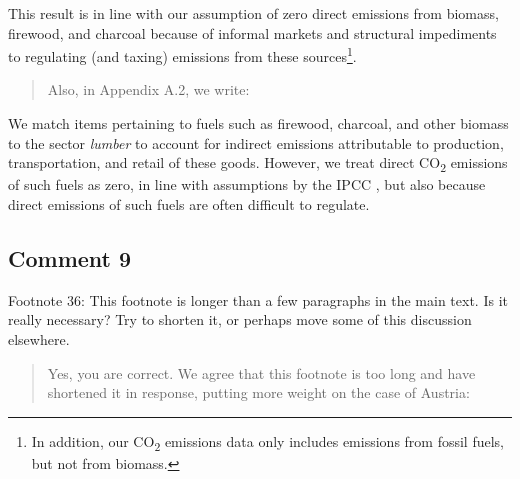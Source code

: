 \documentclass[11pt]{article}
\newenvironment{response}
{\begin{quote}\color{black}}
{\end{quote}}
\begin{document}
\begin{revisionbox}
    This result is in line with our assumption of zero direct emissions from biomass, firewood, and charcoal because of informal markets and structural impediments to regulating (and taxing) emissions from these sources\footnote{In addition, our CO\textsubscript{2} emissions data only includes emissions from fossil fuels, but not from biomass.}.
\end{revisionbox}

\begin{response}
    Also, in Appendix A.2, we write:
\end{response}

\begin{revisionbox}
    We match items pertaining to fuels such as firewood, charcoal, and other biomass to the sector \textit{lumber} to account for indirect emissions attributable to production, transportation, and retail of these goods. However, we treat direct CO\textsubscript{2} emissions of such fuels as zero, in line with assumptions by the IPCC \autocite{Grad.2023}, but also because direct emissions of such fuels are often difficult to regulate.
\end{revisionbox}

\subsection*{Comment 9}\label{comment_R2_9}

\begin{commentbox}
    Footnote 36: This footnote is longer than a few paragraphs in the main text. Is it really necessary? Try to shorten it, or perhaps move some of this discussion elsewhere.
\end{commentbox}

\begin{response}
    Yes, you are correct. We agree that this footnote is too long and have shortened it in response, putting more weight on the case of Austria:
\end{response}
\end{document}
